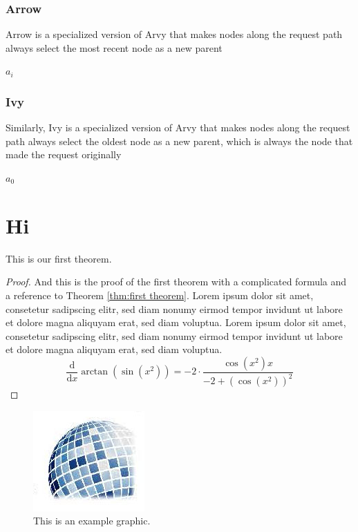 \documentclass[a4paper, oneside]{discothesis}
\begin{document}
\subsection{Arrow}

Arrow is a specialized version of Arvy that makes nodes along the request path always select the most recent node as a new parent
\begin{algorithmic}
\State\Return $a_i$
\EndFunction
\end{algorithmic}

\subsection{Ivy}

Similarly, Ivy is a specialized version of Arvy that makes nodes along the request path always select the oldest node as a new parent, which is always the node that made the request originally
\begin{algorithmic}
\State\Return $a_0$
\EndFunction
\end{algorithmic}

\chapter{Hi}

\begin{theorem}\label{thm:first theorem}
	This is our first theorem.
\end{theorem}

\begin{proof}
	And this is the proof of the first theorem with a complicated formula and a reference to Theorem \ref{thm:first theorem}. Lorem ipsum dolor sit amet, consetetur sadipscing elitr, sed diam nonumy eirmod tempor invidunt ut labore et dolore magna aliquyam erat, sed diam voluptua. Lorem ipsum dolor sit amet, consetetur sadipscing elitr, sed diam nonumy eirmod tempor invidunt ut labore et dolore magna aliquyam erat, sed diam voluptua.
	\begin{equation}
		{\frac {\mathrm d}{\mathrm dx}}\arctan(\sin({x}^{2}))=-2 \cdot {\frac {\cos({x}^{2})x}{-2+\left (\cos({x}^{2})\right )^{2}}}
	\end{equation}	
\end{proof}

\begin{figure}
    \centering
    \includegraphics[width=0.2\columnwidth]{figures/disco_logo_faded}
    \caption{This is an example graphic.}
    \label{fig:example_figure}
\end{figure}
\end{document}
